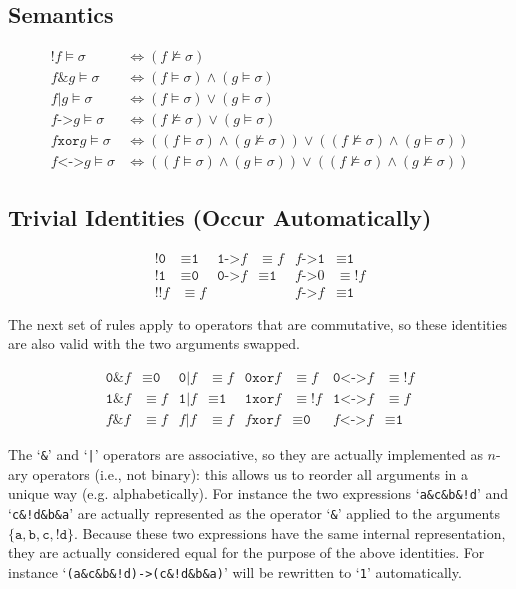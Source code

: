 \documentclass[a4paper,twoside,10pt,DIV=12,draft]{scrreprt}
\DeclareMathOperator{\NOT}{\texttt{!}}
\newcommand{\XOR}{\mathbin{\texttt{xor}}}
\newcommand{\IMPLIES}{\mathbin{\texttt{->}}}
\newcommand{\EQUIV}{\mathbin{\texttt{<->}}}
\newcommand{\OR}{\mathbin{\texttt{|}}}
\newcommand{\AND}{\mathbin{\texttt{\&}}}
\newcommand{\0}{\texttt{0}}
\newcommand{\1}{\texttt{1}}
\newcommand\code[1]{\texttt{#1}}
\newcommand\samp[1]{`\texttt{#1}'}
\begin{document}
\subsection{Semantics}

\begin{align*}
\NOT f\vDash \sigma &\iff (f\nvDash\sigma) \\
f\AND g\vDash \sigma &\iff (f\vDash\sigma)\land(g\vDash\sigma) \\
f\OR g\vDash \sigma &\iff (f\vDash\sigma)\lor(g\vDash\sigma) \\
f\IMPLIES g\vDash \sigma &\iff
           (f\nvDash\sigma)\lor(g\vDash\sigma)\\
f\XOR g\vDash \sigma &\iff
           ((f\vDash\sigma)\land(g\nvDash\sigma))\lor
           ((f\nvDash\sigma)\land(g\vDash\sigma))\\
f\EQUIV g\vDash \sigma &\iff
           ((f\vDash\sigma)\land(g\vDash\sigma))\lor
           ((f\nvDash\sigma)\land(g\nvDash\sigma))
\end{align*}

\subsection{Trivial Identities (Occur Automatically)}


\begin{align*}
  \NOT \0 &\equiv \1 &
  \1\IMPLIES f &\equiv f &
  f\IMPLIES\1 &\equiv \1 \\
  \NOT\1 &\equiv \0 &
  \0\IMPLIES f &\equiv \1&
  f \IMPLIES 0 &\equiv \NOT f \\
  \NOT\NOT f &\equiv f &
  && f\IMPLIES f &\equiv \1
\end{align*}

The next set of rules apply to operators that are commutative, so
these identities are also valid with the two arguments swapped.

\begin{align*}
  \0\AND f   &\equiv \0 &
  \0\OR f &\equiv f&
  \0\XOR f &\equiv f &
  \0\EQUIV f &\equiv \NOT f \\
  \1\AND f   &\equiv f &
  \1\OR f &\equiv \1 &
  \1\XOR f &\equiv \NOT f&
  \1\EQUIV f &\equiv f \\
  f\AND f &\equiv f &
  f\OR f &\equiv f &
  f\XOR f &\equiv \0&
  f\EQUIV f &\equiv \1
\end{align*}

The \samp{\&} and \samp{|} operators are associative, so they are
actually implemented as $n$-ary operators (i.e., not binary): this
allows us to reorder all arguments in a unique way
(e.g. alphabetically).  For instance the two expressions
\samp{a\&c\&b\&!d} and \samp{c\&!d\&b\&a} are actually represented as
the operator \samp{\&} applied to the arguments
$\{\code{a},\code{b},\code{c},\code{!d}\}$.  Because these two
expressions have the same internal representation, they are actually
considered equal for the purpose of the above identities.  For
instance \samp{(a\&c\&b\&!d)->(c\&!d\&b\&a)} will be rewritten to
\samp{1} automatically.
\end{document}
